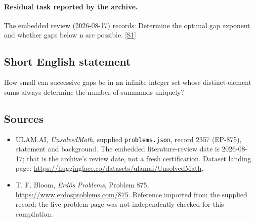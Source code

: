 \documentclass[11pt,a4paper]{article}
\newcommand{\sref}[2]{\hyperlink{source:#1:#2}{[S#2]}}
\begin{document}
\paragraph{Residual task reported by the archive.}

The embedded review (2026-08-17) records: Determine the optimal gap exponent and whether gaps below n are possible. \sref{2357}{1}

\subsection{Short English statement}

How small can successive gaps be in an infinite integer set whose distinct-element sums always determine the number of summands uniquely?

\subsection{Sources}

{\small

\begin{itemize}

\item[\hypertarget{source:2357:1}{S1}] ULAM.AI, \emph{UnsolvedMath}, supplied \texttt{problems.json}, record 2357 (EP-875), statement and background. The embedded literature-review date is 2026-08-17; that is the archive’s review date, not a fresh certification. Dataset landing page: \url{https://huggingface.co/datasets/ulamai/UnsolvedMath}.

\item[\hypertarget{source:2357:2}{S2}] T. F. Bloom, \emph{Erdős Problems}, Problem 875, \url{https://www.erdosproblems.com/875}. Reference imported from the supplied record; the live problem page was not independently checked for this compilation.

\end{itemize}

}

\label{end:2357}
\end{document}
